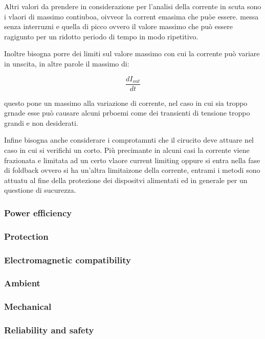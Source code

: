 \documentclass[../main.tex]{subfiles}
\begin{document}
Altri valori da prendere in considerazione per l'analisi della corrente in scuta sono i vlaori di massimo contiuboa, oivveor la corrent emasima che puòe essere. messa senza interruzni e quella di picco ovvero il valore massimo che può essere ragigunto per un ridotto periodo di tempo in modo ripetitivo.

Inoltre bisogna porre dei limiti sul valore massimo con cui la corrente può variare in unscita, in altre parole il massimo di:

\begin{equation}
	\frac{\unit{d}I_{out}}{\unit{d}t}
\end{equation}

questo pone un massimo alla variazione di corrente, nel caso in cui sia troppo grnade esse può causare alcuni prboemi come dei transienti di tensione troppo grandi e non desiderati.

Infine bisogna anche considerare i comprotamnti che il cirucito deve attuare nel caso in cui si verifichi un corto.
Più precimante in alcuni casi la corrente viene frazionata e limitata ad un certo vlaore current limiting oppure si entra nella fase di foldback ovvero si ha un'altra limitaizone della corrente, entrami i metodi sono attuatu al fine della protezione dei dispositvi alimentati ed in generale per un questione di sucurezza.

\subsubsection*{Power efficiency}


\subsubsection*{Protection}

\subsubsection*{Electromagnetic compatibility}

\subsubsection*{Ambient}

\subsubsection*{Mechanical}

\subsubsection*{Reliability and safety}
\end{document}
